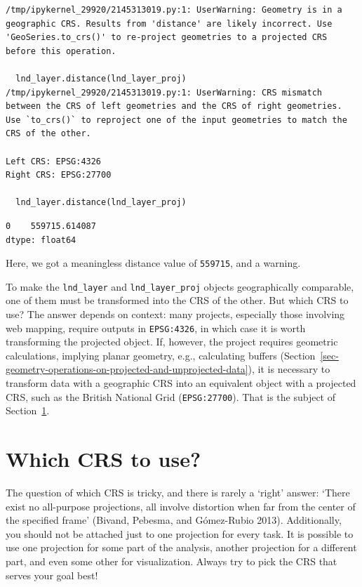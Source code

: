 \documentclass[
  letterpaper,
]{krantz}
\begin{document}
\begin{verbatim}
/tmp/ipykernel_29920/2145313019.py:1: UserWarning: Geometry is in a geographic CRS. Results from 'distance' are likely incorrect. Use 'GeoSeries.to_crs()' to re-project geometries to a projected CRS before this operation.

  lnd_layer.distance(lnd_layer_proj)
/tmp/ipykernel_29920/2145313019.py:1: UserWarning: CRS mismatch between the CRS of left geometries and the CRS of right geometries.
Use `to_crs()` to reproject one of the input geometries to match the CRS of the other.

Left CRS: EPSG:4326
Right CRS: EPSG:27700

  lnd_layer.distance(lnd_layer_proj)
\end{verbatim}

\begin{verbatim}
0    559715.614087
dtype: float64
\end{verbatim}

Here, we got a meaningless distance value of \texttt{559715}, and a
warning.

To make the \texttt{lnd\_layer} and \texttt{lnd\_layer\_proj} objects
geographically comparable, one of them must be transformed into the CRS
of the other. But which CRS to use? The answer depends on context: many
projects, especially those involving web mapping, require outputs in
\texttt{EPSG:4326}, in which case it is worth transforming the projected
object. If, however, the project requires geometric calculations,
implying planar geometry, e.g., calculating buffers
(Section~\ref{sec-geometry-operations-on-projected-and-unprojected-data}),
it is necessary to transform data with a geographic CRS into an
equivalent object with a projected CRS, such as the British National
Grid (\texttt{EPSG:27700}). That is the subject of
Section~\ref{sec-which-crs-to-use}.

\section{Which CRS to use?}\label{sec-which-crs-to-use}

The question of which CRS is tricky, and there is rarely a `right'
answer: `There exist no all-purpose projections, all involve distortion
when far from the center of the specified frame' (Bivand, Pebesma, and
Gómez-Rubio 2013). Additionally, you should not be attached just to one
projection for every task. It is possible to use one projection for some
part of the analysis, another projection for a different part, and even
some other for visualization. Always try to pick the CRS that serves
your goal best!
\end{document}
